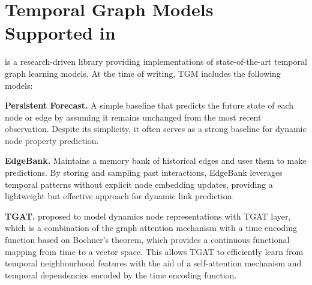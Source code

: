 \begin{table}[t]
\caption{Dataset statistics. } \label{tab:data} 
\centering
  \vspace{-10pt}
\end{table}

\section{Temporal Graph Models Supported in \name}
\name is a research-driven library providing implementations of state-of-the-art temporal graph learning models. At the time of writing, TGM includes the following models:

\textbf{Persistent Forecast.} A simple baseline that predicts the future state of each node or edge by assuming it remains unchanged from the most recent observation. Despite its simplicity, it often serves as a strong baseline for dynamic node property prediction.

\textbf{EdgeBank.} \cite{edgebank} Maintains a memory bank of historical edges and uses them to make predictions. By storing and sampling past interactions, EdgeBank leverages temporal patterns without explicit node embedding updates, providing a lightweight but effective approach for dynamic link prediction.


\textbf{TGAT.} \cite{tgat} proposed to model dynamics node representations with TGAT layer, which is a combination of the graph attention mechanism with a time encoding function based on Bochner’s theorem, which provides a continuous functional mapping from time to a vector space. This allows TGAT to efficiently learn from temporal neighbourhood features with the aid of a self-attention mechanism and temporal dependencies encoded by the time encoding function.

